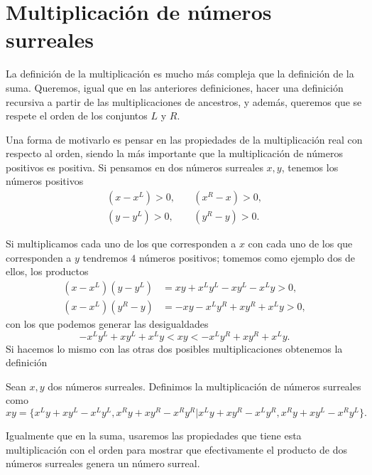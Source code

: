 \section {Multiplicación de números surreales}
    
    La definici\'on de la multiplicaci\'on es mucho m\'as compleja que la definici\'on de la suma. Queremos, igual que en las anteriores definiciones, hacer una definici\'on recursiva a partir de las multiplicaciones de ancestros, y adem\'as, queremos que se respete el orden de los conjuntos $L$ y $R$.

    Una forma de motivarlo es pensar en las propiedades de la multiplicaci\'on real con respecto al orden, siendo la m\'as importante que la multiplicaci\'on de n\'umeros positivos es positiva. Si pensamos en dos n\'umeros surreales $x,y$, tenemos los n\'umeros positivos
    \begin{align*}
        (x-x^L) > 0, \quad & (x^R-x)>0, \\
        (y-y^L) > 0, \quad & (y^R-y)>0.
    \end{align*}

    Si multiplicamos cada uno de los que corresponden a $x$ con cada uno de los que corresponden a $y$ tendremos $4$ n\'umeros positivos; tomemos como ejemplo dos de ellos, los productos
    \begin{align*}
        (x-x^L)(y-y^L) &= xy + x^Ly^L - xy^L - x^Ly > 0,\\
        (x-x^L)(y^R-y) &= -xy -x^Ly^R + xy^R + x^Ly > 0,
    \end{align*}
    con los que podemos generar las desigualdades
    \[
        - x^Ly^L + xy^L + x^Ly < xy < -x^Ly^R + xy^R + x^Ly.
    \]
    Si hacemos lo mismo con las otras dos posibles multiplicaciones obtenemos la definici\'on

    \begin{definition}[Multiplicaci\'on]
        Sean $x, y$ dos n\'umeros surreales. Definimos la multiplicaci\'on de n\'umeros surreales como
        \[
            xy = \big\{x^Ly+xy^L-x^Ly^L, x^Ry+xy^R-x^Ry^R\big|x^Ly+xy^R-x^Ly^R, x^Ry+xy^L-x^Ry^L\big\}.
        \]
    \end{definition}

    Igualmente que en la suma, usaremos las propiedades que tiene esta multiplicaci\'on con el orden para mostrar que efectivamente el producto de dos n\'umeros surreales genera un n\'umero surreal.

